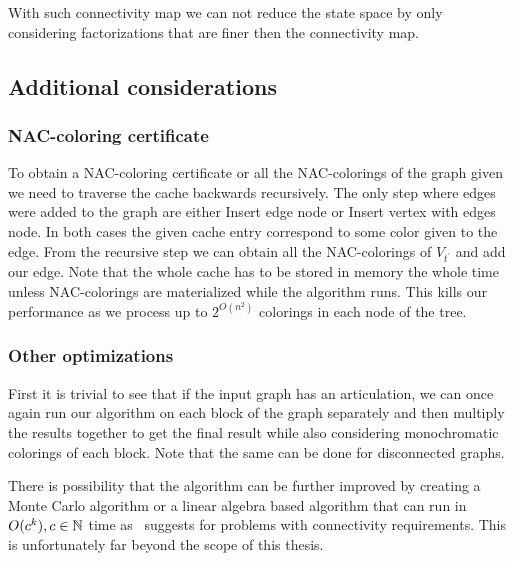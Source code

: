 With such connectivity map we can not reduce the state space by only considering
factorizations that are finer then the connectivity map.


\subsection{Additional considerations}

\subsubsection{NAC-coloring certificate}

To obtain a NAC-coloring certificate or all the NAC-colorings of the graph
given we need to traverse the cache backwards recursively.
The only step where edges were added to the graph are either Insert edge node
or Insert vertex with edges node. In both cases the given cache entry correspond
to some color given to the edge. From the recursive step we can obtain
all the NAC-colorings of \( V_{t^\prime} \) and add our edge.
Note that the whole cache has to be stored in memory the whole time unless
NAC-colorings are materialized while the algorithm runs.
This kills our performance as we process up to \( 2^{O(n^2)} \) colorings
in each node of the tree.

\subsubsection{Other optimizations}

First it is trivial to see that if the input graph has an articulation,
we can once again run our algorithm on each block of the graph separately
and then multiply the results together to get the final result
while also considering monochromatic colorings of each block.
Note that the same can be done for disconnected graphs.

There is possibility that the algorithm can be further improved by creating
a Monte Carlo algorithm or a linear algebra based algorithm that can run
in \( O(c^k), c \in \mathbb{N} \) time as~\cite{book_parametrized_algorithms} suggests
for problems with connectivity requirements.
This is unfortunately far beyond the scope of this thesis.


